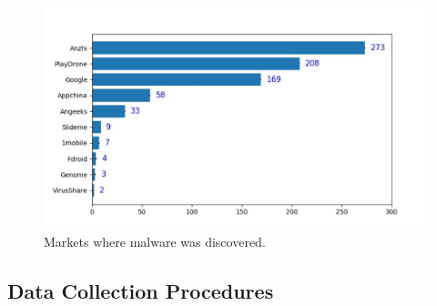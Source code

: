 \begin{figure}[ht]
\centering
\includegraphics[scale=0.4]{images/stores.pdf}
\caption{Markets where malware was discovered.}
 \label{fig:stores}
\end{figure}






\subsection{Data Collection Procedures} \label{sec:dataCollectionProc}



